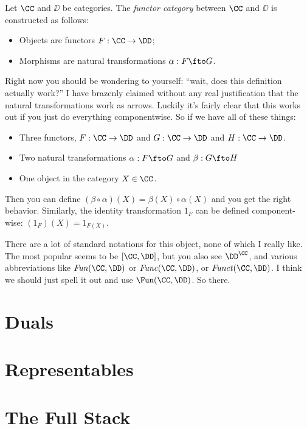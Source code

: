\begin{defn}
 Let $\CC$ and $\DD$ be categories. The \emph{functor category} between $\CC$ and $\DD$ is
 constructed as follows:
 \begin{itemize}
  \item Objects are functors $F: \CC \to \DD$;
  \item Morphisms are natural transformations $\alpha:F\fto G$.
 \end{itemize}
\end{defn}
\noindent
Right now you should be wondering to yourself: ``wait, does this definition actually
work?'' I have brazenly claimed without any real justification that the natural
transformations work as arrows. Luckily it's fairly clear that this works out if you just
do everything componentwise. So if we have all of these things: 
\begin{itemize}
\item Three functors, $F: \CC \to \DD$ and $G: \CC \to \DD$ and $H:\CC \to \DD$.

\item Two natural transformations $\alpha: F \fto G$ and $\beta: G \fto H$

\item One object in the category $X \in \CC$.
\end{itemize}
\noindent
Then you can define $(\beta \circ \alpha)(X) = \beta(X) \circ \alpha(X)$ and you get the 
right behavior.
Similarly, the identity transformation $1_F$ can be defined component-wise: $(1_F)(X)
= 1_{F(X)}$.

There are a lot of standard notations for this object, none of which I really like. The
most popular seems to be $[\CC, \DD]$, but you also see $\DD^{\CC}$, and various  
abbreviations like $\mathop{\mathit{Fun}}(\CC,\DD)$ or $\mathop{\mathit{Func}}(\CC,\DD)$,
or $\mathop{\mathit{Funct}}(\CC,\DD)$. I think we should just spell it out and use
$\Fun(\CC,\DD)$. So there.

\section{Duals}



\section{Representables}

\section{The Full Stack}

